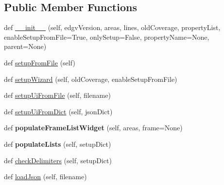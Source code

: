 \subsection*{Public Member Functions}
\begin{DoxyCompactItemize}
\item 
def \mbox{\hyperlink{class_dsg_tools_1_1_custom_widgets_1_1setup_earth_coverage_1_1_setup_earth_coverage_a085d58c4d33be69f515a489ba9ff6a29}{\+\_\+\+\_\+init\+\_\+\+\_\+}} (self, edgv\+Version, areas, lines, old\+Coverage, property\+List, enable\+Setup\+From\+File=True, only\+Setup=False, property\+Name=None, parent=None)
\item 
def \mbox{\hyperlink{class_dsg_tools_1_1_custom_widgets_1_1setup_earth_coverage_1_1_setup_earth_coverage_a54d2b5406367f9ad7310bb422bb1f702}{setup\+From\+File}} (self)
\item 
def \mbox{\hyperlink{class_dsg_tools_1_1_custom_widgets_1_1setup_earth_coverage_1_1_setup_earth_coverage_adec163acc8b4756dbc6b413989abb26b}{setup\+Wizard}} (self, old\+Coverage, enable\+Setup\+From\+File)
\item 
def \mbox{\hyperlink{class_dsg_tools_1_1_custom_widgets_1_1setup_earth_coverage_1_1_setup_earth_coverage_aa2bfcb725f3e9c36d4df890ae7656879}{setup\+Ui\+From\+File}} (self, filename)
\item 
def \mbox{\hyperlink{class_dsg_tools_1_1_custom_widgets_1_1setup_earth_coverage_1_1_setup_earth_coverage_a52b6b311cf997811b741f9cd700cad79}{setup\+Ui\+From\+Dict}} (self, json\+Dict)
\item 
\mbox{\label{class_dsg_tools_1_1_custom_widgets_1_1setup_earth_coverage_1_1_setup_earth_coverage_a128db919ac67204c51b6d52b99f6c59b}} 
def {\bfseries populate\+Frame\+List\+Widget} (self, areas, frame=None)
\item 
\mbox{\label{class_dsg_tools_1_1_custom_widgets_1_1setup_earth_coverage_1_1_setup_earth_coverage_af00124649a59126471add34778e4ea56}} 
def {\bfseries populate\+Lists} (self, setup\+Dict)
\item 
def \mbox{\hyperlink{class_dsg_tools_1_1_custom_widgets_1_1setup_earth_coverage_1_1_setup_earth_coverage_a1689eadb2c927238bdfb4de47516e99c}{check\+Delimiters}} (self, setup\+Dict)
\item 
def \mbox{\hyperlink{class_dsg_tools_1_1_custom_widgets_1_1setup_earth_coverage_1_1_setup_earth_coverage_a63be88f7f3d02f50ddfb3f1712937bc7}{load\+Json}} (self, filename)

\end{DoxyCompactItemize}
